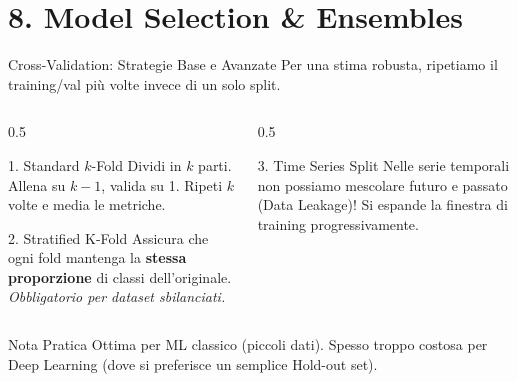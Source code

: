 \documentclass[aspectratio=169, 10pt]{beamer}
\begin{document}
\section{8. Model Selection \& Ensembles}

\begin{frame}{Cross-Validation: Strategie Base e Avanzate}
    Per una stima robusta, ripetiamo il training/val più volte invece di un solo split.

    \begin{columns}[T]
        \begin{column}{0.5\textwidth}
            \begin{block}{1. Standard $k$-Fold}
                Dividi in $k$ parti. Allena su $k-1$, valida su 1. Ripeti $k$ volte e media le metriche.
            \end{block}
            
            \begin{block}{2. Stratified K-Fold}
                Assicura che ogni fold mantenga la \textbf{stessa proporzione} di classi dell'originale.
                \small \emph{Obbligatorio per dataset sbilanciati.}
            \end{block}
        \end{column}

        \begin{column}{0.5\textwidth}
            \begin{block}{3. Time Series Split}
                Nelle serie temporali non possiamo mescolare futuro e passato (Data Leakage)!
                \small Si espande la finestra di training progressivamente.
            \end{block}

            \centering
            \vspace{0.2em}
        \end{column}
    \end{columns}

    \vspace{0.5em}
    \begin{alertblock}{Nota Pratica}
        Ottima per ML classico (piccoli dati). Spesso troppo costosa per Deep Learning (dove si preferisce un semplice Hold-out set).
    \end{alertblock}
\end{frame}
\end{document}

